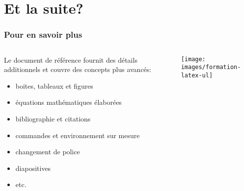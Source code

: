 
\section{Et la suite?}

\begin{frame}
  \frametitle{Pour en savoir plus}

  \begin{columns}
    \begin{column}{.6\textwidth}
      Le document de référence fournit des détails additionnels et
      couvre des concepts plus avancés:
      \begin{itemize}
        \small
      \item boites, tableaux et figures
      \item équations mathématiques élaborées
      \item bibliographie et citations
      \item commandes et environnement sur mesure
      \item changement de police
      \item diapositives
      \item etc.
      \end{itemize}
    \end{column}
    \begin{column}{.4\textwidth}
      \texttt{[image: images/formation-latex-ul]}
    \end{column}
  \end{columns}
\end{frame}

